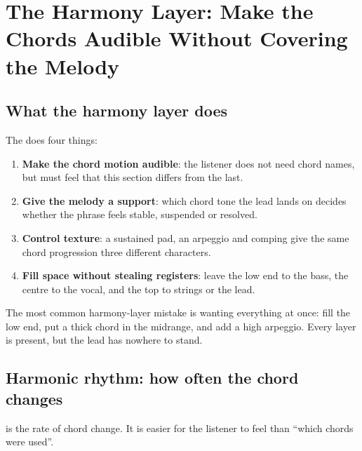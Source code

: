 \chapter{The Harmony Layer: Make the Chords Audible Without Covering the Melody}
\label{ch:harmony}


\section{What the harmony layer does}
\label{sec:harmony-job}

The  does four things:

\begin{enumerate}
\item \textbf{Make the chord motion audible}: the listener does not need chord names, but must feel that this section differs from the last.
\item \textbf{Give the melody a support}: which chord tone the lead lands on decides whether the phrase feels stable, suspended or resolved.
\item \textbf{Control texture}: a sustained pad, an arpeggio and comping give the same chord progression three different characters.
\item \textbf{Fill space without stealing registers}: leave the low end to the bass, the centre to the vocal, and the top to strings or the lead.
\end{enumerate}

The most common harmony-layer mistake is wanting everything at once: fill the low end, put a thick chord in the midrange, and add a high arpeggio. Every layer is present, but the lead has nowhere to stand.

\section{Harmonic rhythm: how often the chord changes}
\label{sec:harmonic-rhythm}

 is the rate of chord change. It is easier for the listener to feel than ``which chords were used''.

